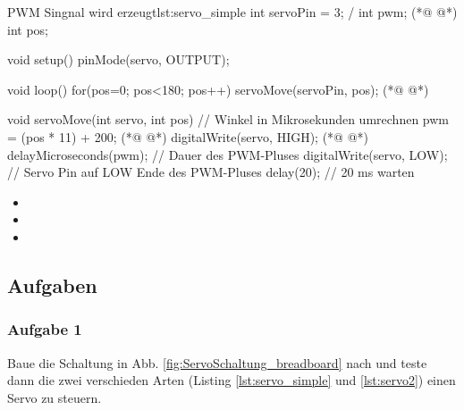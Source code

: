 \begin{multicols}{2}
\begin{arduinoCode}{PWM Singnal wird erzeugt}{lst:servo_simple}
int servoPin = 3; /
int pwm;  (*@  @*) 
int pos; 

void setup() {
   pinMode(servo, OUTPUT);
}

void loop() {
  for(pos=0; pos<180; pos++) {
    servoMove(servoPin, pos); (*@  @*) 
  }
}

void servoMove(int servo, int pos){
  // Winkel in Mikrosekunden umrechnen
  pwm = (pos * 11) + 200; (*@ \label{lis:servo_postotime} @*)  
  digitalWrite(servo, HIGH); (*@  @*)
  delayMicroseconds(pwm); // Dauer des PWM-Pluses
  digitalWrite(servo, LOW); // Servo Pin auf LOW Ende des PWM-Pluses
  delay(20); // 20 ms warten
}
\end{arduinoCode}
\columnbreak
\vfill\null 
\begin{itemize}
  \itemsep40pt
    \item[] 
    \item[] 
    \item[]     
 \end{itemize}
\vfill \null

\end{multicols}

\subsection{Aufgaben}

\subsubsection{Aufgabe 1}
Baue die Schaltung in Abb. \ref{fig:ServoSchaltung_breadboard} nach und teste dann die zwei verschieden Arten (Listing \ref{lst:servo_simple} und \ref{lst:servo2}) einen Servo zu steuern. 
